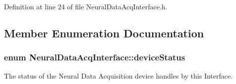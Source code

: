 Definition at line 24 of file Neural\-Data\-Acq\-Interface.\-h.



\subsection{Member Enumeration Documentation}
\hypertarget{class_neural_data_acq_interface_a18d2ffb89521e40cba91a159e47fd449}{
\subsubsection[{device\-Status}]{\setlength{\rightskip}{0pt plus 5cm}enum {\bf Neural\-Data\-Acq\-Interface\-::device\-Status}}}\label{class_neural_data_acq_interface_a18d2ffb89521e40cba91a159e47fd449}


The status of the Neural Data Acquisition device handles by this Interface. 


